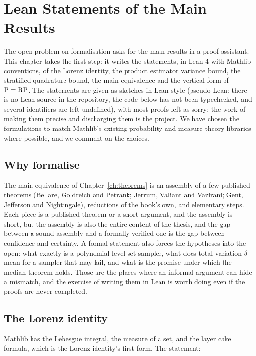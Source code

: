 \chapter{Lean Statements of the Main Results}
\label{ch:lean}

The open problem on formalisation asks for the main results in a proof assistant. This chapter takes the first step: it writes the statements, in Lean 4 with Mathlib conventions, of the Lorenz identity, the product estimator variance bound, the stratified quadrature bound, the main equivalence and the vertical form of $\mathrm{P} = \mathrm{RP}$. The statements are given as sketches in Lean style (pseudo-Lean: there is no Lean source in the repository, the code below has not been typechecked, and several identifiers are left undefined), with most proofs left as sorry; the work of making them precise and discharging them is the project. We have chosen the formulations to match Mathlib's existing probability and measure theory libraries where possible, and we comment on the choices.

\section{Why formalise}

The main equivalence of Chapter~\ref{ch:theorems} is an assembly of a few published theorems (Bellare, Goldreich and Petrank; Jerrum, Valiant and Vazirani; Gent, Jefferson and Nightingale), reductions of the book's own, and elementary steps. Each piece is a published theorem or a short argument, and the assembly is short, but the assembly is also the entire content of the thesis, and the gap between a sound assembly and a formally verified one is the gap between confidence and certainty. A formal statement also forces the hypotheses into the open: what exactly is a polynomial level set sampler, what does total variation $\delta$ mean for a sampler that may fail, and what is the promise under which the median theorem holds. Those are the places where an informal argument can hide a mismatch, and the exercise of writing them in Lean is worth doing even if the proofs are never completed.

\section{The Lorenz identity}

Mathlib has the Lebesgue integral, the measure of a set, and the layer cake formula, which is the Lorenz identity's first form. The statement:

